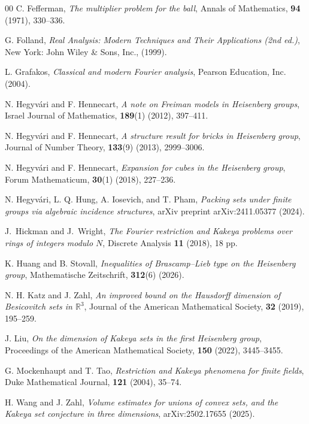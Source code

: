 \documentclass[11pt]{article}
\newcommand{\1}{\mathbf 1}
\begin{document}
\begin{thebibliography}{00}
C. Fefferman, \textit{The multiplier problem for the ball}, Annals of Mathematics, \textbf{94} (1971), 330--336.

G. Folland, \textit{Real Analysis: Modern Techniques and Their Applications (2nd ed.)}, New York: John Wiley \& Sons, Inc., (1999).

L. Grafakos, \textit{Classical and modern Fourier analysis}, Pearson Education, Inc. (2004).


N. Hegyv\'{a}ri and F. Hennecart, \textit{A note on Freiman models in Heisenberg groups}, Israel Journal of Mathematics, \textbf{189}(1) (2012), 397--411.

N. Hegyv\'{a}ri and F. Hennecart, \textit{A structure result for bricks in Heisenberg group}, Journal of Number Theory, \textbf{133}(9) (2013), 2999--3006.

N. Hegyv\'{a}ri and F. Hennecart, \textit{Expansion for cubes in the Heisenberg group}, Forum Mathematicum, \textbf{30}(1) (2018), 227--236.

N. Hegyv\'{a}ri, L. Q. Hung, A. Iosevich, and T. Pham, \textit{Packing sets under finite groups via algebraic incidence structures}, arXiv preprint arXiv:2411.05377 (2024).

J.~Hickman and J.~Wright,
\textit{The Fourier restriction and Kakeya problems over rings of integers modulo $N$}, Discrete Analysis \textbf{11} (2018), 18 pp.

K. Huang and B. Stovall, \textit{Inequalities of Brascamp–Lieb type on the Heisenberg group}, Mathematische Zeitschrift, \textbf{312}(6) (2026).


N. H. Katz and J. Zahl, \textit{An improved bound on the Hausdorff dimension of Besicovitch sets in $\mathbb{R}^3$},
Journal of the American Mathematical Society, \textbf{32} (2019), 195--259.


J. Liu, \textit{On the dimension of Kakeya sets in the first Heisenberg group},
Proceedings of the American Mathematical Society, \textbf{150} (2022), 3445--3455.


G. Mockenhaupt and T. Tao, \textit{Restriction and Kakeya phenomena for finite fields},
Duke Mathematical Journal, \textbf{121} (2004), 35--74.



H. Wang and J. Zahl, \textit{Volume estimates for unions of convex sets, and the Kakeya set conjecture in three dimensions},
arXiv:2502.17655 (2025).



\end{thebibliography}
\end{document}
